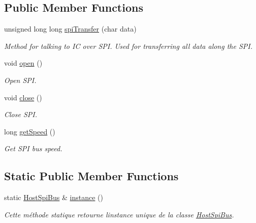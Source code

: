 \subsection*{Public Member Functions}
\begin{DoxyCompactItemize}
\item 
\mbox{\label{classHostSpiBus_a2ad6ec13e696f1d0578cfdd9adbbc390}} 
unsigned long long \hyperlink{classHostSpiBus_a2ad6ec13e696f1d0578cfdd9adbbc390}{spi\+Transfer} (char data)
\begin{DoxyCompactList}\small\item\em Method for talking to IC over S\+PI. Used for transferring all data along the S\+PI. \end{DoxyCompactList}\item 
\mbox{\label{classHostSpiBus_a75147b2a49307545e835a7d3d4b6ce6e}} 
void \hyperlink{classHostSpiBus_a75147b2a49307545e835a7d3d4b6ce6e}{open} ()
\begin{DoxyCompactList}\small\item\em Open S\+PI. \end{DoxyCompactList}\item 
\mbox{\label{classHostSpiBus_ac0bc68b7f3ac27638a3ccef32b71f450}} 
void \hyperlink{classHostSpiBus_ac0bc68b7f3ac27638a3ccef32b71f450}{close} ()
\begin{DoxyCompactList}\small\item\em Close S\+PI. \end{DoxyCompactList}\item 
\mbox{\label{classHostSpiBus_ab3d844e5e78d208ac9333153b025a6d8}} 
long \hyperlink{classHostSpiBus_ab3d844e5e78d208ac9333153b025a6d8}{get\+Speed} ()
\begin{DoxyCompactList}\small\item\em Get S\+PI bus speed. \end{DoxyCompactList}\end{DoxyCompactItemize}
\subsection*{Static Public Member Functions}
\begin{DoxyCompactItemize}
\item 
static \hyperlink{classHostSpiBus}{Host\+Spi\+Bus} \& \hyperlink{classHostSpiBus_ad8d44e1399e0d42ce0306b67e30ce08d}{instance} ()
\begin{DoxyCompactList}\small\item\em Cette méthode statique retourne l\textquotesingle{}instance unique de la classe \hyperlink{classHostSpiBus}{Host\+Spi\+Bus}. \end{DoxyCompactList}\end{DoxyCompactItemize}


